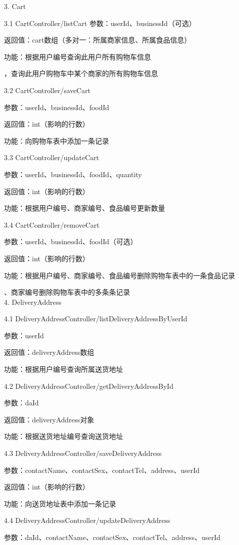 3. Cart

3.1 CartController/listCart 
参数：userId、businessId（可选）

返回值：cart数组（多对一：所属商家信息、所属食品信息）

功能：根据用户编号查询此用户所有购物车信息

\qquad{}，查询此用户购物车中某个商家的所有购物车信息

3.2 CartController/saveCart 

参数：userId、businessId、foodId 

返回值：int（影响的行数）

功能：向购物车表中添加一条记录

3.3 CartController/updateCart 

参数：userId、businessId、foodId、quantity

返回值：int（影响的行数）

功能：根据用户编号、商家编号、食品编号更新数量

3.4 CartController/removeCart 

参数：userId、businessId、foodId（可选）

返回值：int（影响的行数）

功能：根据用户编号、商家编号、食品编号删除购物车表中的一条食品记录

\qquad{}、商家编号删除购物车表中的多条条记录~\\

4. DeliveryAddress

4.1 DeliveryAddressController/listDeliveryAddressByUserId 

参数：userId 

返回值：deliveryAddress数组

功能：根据用户编号查询所属送货地址

4.2 DeliveryAddressController/getDeliveryAddressById 

参数：daId 

返回值：deliveryAddress对象

功能：根据送货地址编号查询送货地址

4.3 DeliveryAddressController/saveDeliveryAddress 

参数：contactName、contactSex、contactTel、address、userId 

返回值：int（影响的行数）

功能：向送货地址表中添加一条记录

4.4 DeliveryAddressController/updateDeliveryAddress

参数：daId、contactName、contactSex、contactTel、address、userId

